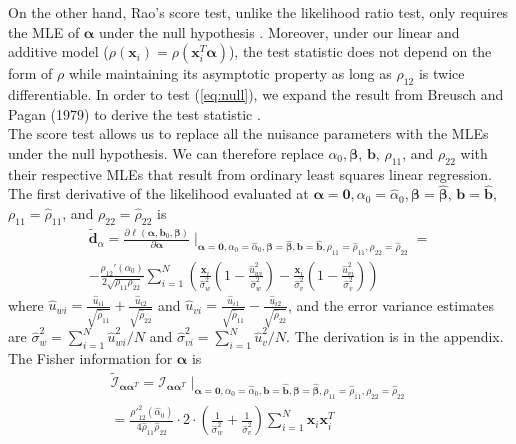 \documentclass[aap, preprint]{imsart}
\numberwithin{equation}{section}
\theoremstyle{plain}
\begin{document}
On the other hand, Rao's score test, unlike the likelihood ratio test, only requires the MLE of $\bm{\alpha}$ under the null hypothesis \cite{rao1973linear}. Moreover, under our linear and additive model ($\rho(\bm{x}_i) = \rho(\bm{x}_i^T\bm{\alpha})$), the test statistic does not depend on the form of $\rho$ while maintaining its asymptotic property as long as $\rho_{12}$ is twice differentiable. In order to test (\ref{eq:null}), we expand the result from Breusch and Pagan (1979) to derive the test statistic \cite{breusch1979simple}.\\ 

The score test allows us to replace all the nuisance parameters with the MLEs under the null hypothesis. We can therefore replace $\alpha_0, \bm{\beta}$, $\bm{b}$, $\rho_{11}$, and $\rho_{22}$ with their respective MLEs that result from ordinary least squares linear regression. The first derivative of the likelihood evaluated at $\bm{\alpha}=\bm{0}, \alpha_0 = \hat{\alpha}_0, \bm{\beta} = \bm{\hat{\beta}}$, $\bm{b} = \bm{\hat{b}}$, $\rho_{11} = \hat{\rho}_{11}$, and $\rho_{22} = \hat{\rho}_{22}$ is
\begin{equation}
\begin{multlined}
\bm{\tilde{d}}_{\alpha} = \frac{\partial \ell(\bm{\alpha}, \bm{b}_0, \bm{\beta})} {\partial \bm{\alpha}}\mid_{\bm{\alpha}=\bm{0}, \alpha_0 = \hat{\alpha}_0, \bm{\beta} = \bm{\hat{\beta}}, \bm{b} = \bm{\hat{b}}, \rho_{11} = \hat{\rho}_{11}, \rho_{22} = \hat{\rho}_{22}} =\\
-\frac{\rho_{12}'(\alpha_0)}{2\sqrt{\rho_{11}\rho_{22}}} \sum_{i=1}^{N} \left(
    \frac{\bm{x}_i}{\hat{\sigma}_{w}^2} 
    \left( 1-\frac{\hat{u}_{wi}^2}{\hat{\sigma}_{w}^2}\right) - 
    \frac{\bm{x}_i}{\hat{\sigma}_{v}^2} 
    \left( 1-\frac{\hat{u}_{vi}^2}{\hat{\sigma}_{v}^2}\right) 
    \right)
\end{multlined}
\label{first_derivative}
\end{equation}
where $\hat{u}_{wi} = \frac{\hat{u}_{i1}}{\sqrt{\hat{\rho}_{11}}} +  \frac{\hat{u}_{i2}}{\sqrt{\hat{\rho}_{22}}}$ and $\hat{u}_{vi} = \frac{\hat{u}_{i1}}{\sqrt{\hat{\rho}_{11}}} -  \frac{\hat{u}_{i2}}{\sqrt{\hat{\rho}_{22}}}$, and the error variance estimates are $\hat{\sigma}_w^2 = \sum_{i=1}^{N} \hat{u}_{wi}^2/N$ and $\hat{\sigma}_{vi}^2 = \sum_{i=1}^{N}\hat{u}_v^2/N$. The derivation is in the appendix. The Fisher information for $\bm{\alpha}$ is
\begin{equation}
\begin{multlined}
        \tilde{\mathcal{I}}_{\bm{\alpha}\bm{\alpha}^T} = \mathcal{I}_{\bm{\alpha}\bm{\alpha}^T}\mid_{
        \bm{\alpha}=\bm{0}, 
        \alpha_0 = \hat{\alpha}_0,
        \bm{b} = \bm{\hat{b}},
        \bm{\beta} = \bm{\hat{\beta}},
        {\rho}_{11} = \hat{\rho}_{11},
        {\rho}_{22} = \hat{\rho}_{22}}\\
        = \frac{{\rho'}^2_{12}(\hat{\alpha}_0)}{4\hat{\rho}_{11}\hat{\rho}_{22}}\cdot 2 \cdot \left(\frac{1}{\hat{\sigma}_{w}^2} +  \frac{1}{\hat{\sigma}_{v}^2}\right) \sum_{i=1}^{N} \bm{x}_i \bm{x}_i^T
    \end{multlined}
\end{equation}
\end{document}
